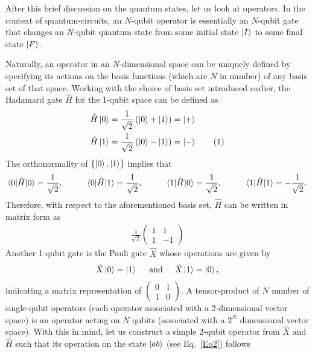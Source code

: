 \documentclass[12pt,oneside]{book}
\newcommand\numberthis{\addtocounter{equation}{1}\tag{\theequation}}
\begin{document}
After this brief discussion on the quantum states, let us look at operators. In the context of quantum-circuits, an $N$-qubit operator is essentially an $N$-qubit gate that changes an $N$-qubit quantum state from some initial state $\ket{I}$ to some final state $\ket{F}$.

Naturally, an operator in an $N$-dimensional space can be uniquely defined by specifying its actions on the basis functions (which are $N$ in number) of any basis set of that space. Working with the choice of basis set introduced earlier, the Hadamard gate $\hat{H}$ for the 1-qubit space can be defined as
\begin{align*}\label{Hadamard}
    \hat{H}\ket{0} &{}= \frac{1}{\sqrt{2}}\left(\ket{0}+\ket{1}\right) = \ket{+}\\
    \hat{H}\ket{1} &{}= \frac{1}{\sqrt{2}}\left(\ket{0}-\ket{1}\right) = \ket{-}\numberthis
\end{align*}
The orthonormality of $\{\ket{0},\ket{1}\}$ implies that
\begin{align*}
    \braket{0|\hat{H}|0}=\frac{1}{\sqrt{2}}, \hspace{1cm} \braket{0|\hat{H}|1}=\frac{1}{\sqrt{2}}, \hspace{1cm} \braket{1|\hat{H}|0}=\frac{1}{\sqrt{2}}, \hspace{1cm}
    \braket{1|\hat{H}|1}=-\frac{1}{\sqrt{2}}.
\end{align*}
Therefore, with respect to the aforementioned basis set, $\hat{H}$ can be written in matrix form as
\begin{align}
    \frac{1}{\sqrt{2}}\begin{pmatrix}
        1 & 1\\ 1 & -1
    \end{pmatrix}
\end{align}
Another 1-qubit gate is the Pauli gate $\hat{X}$ whose operations are given by
\begin{align*}
    \hat{X}\ket{0} = \ket{1} \hspace{0.5cm} \mathrm{and} \hspace{0.5cm} \hat{X}\ket{1}=\ket{0},
\end{align*}
indicating a matrix representation of $\begin{pmatrix}
    0 & 1\\ 1 & 0
\end{pmatrix}$.
A tensor-product of $N$ number of single-qubit operators (each operator associated with a 2-dimensional vector space) is an operator acting on $N$ qubits (associated with a $2^N$ dimensional vector space). With this in mind, let us construct a simple 2-qubit operator from $\hat{X}$ and $\hat{H}$ such that its operation on the state $\ket{ab}$ (see Eq.~\ref{Eq2}) follows
\end{document}
